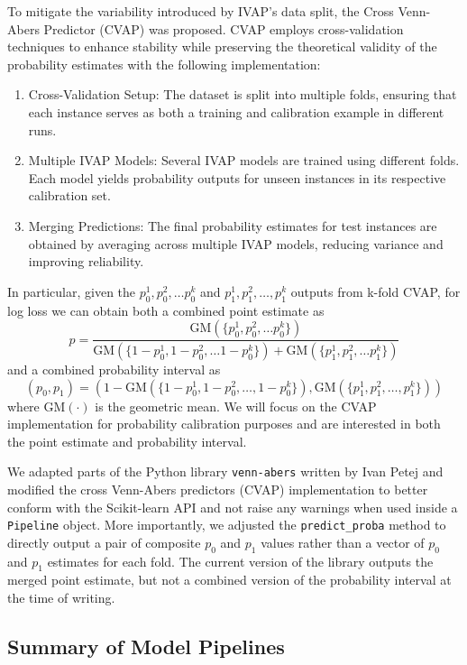 \documentclass[12pt,twoside]{report}
\begin{document}
To mitigate the variability introduced by IVAP’s data split, the Cross Venn-Abers Predictor (CVAP) was proposed. CVAP employs cross-validation techniques to enhance stability while preserving the theoretical validity of the probability estimates with the following implementation:
\begin{enumerate}
    \item Cross-Validation Setup: The dataset is split into multiple folds, ensuring that each instance serves as both a training and calibration example in different runs.

    \item Multiple IVAP Models: Several IVAP models are trained using different folds. Each model yields probability outputs for unseen instances in its respective calibration set.

    \item Merging Predictions: The final probability estimates for test instances are obtained by averaging across multiple IVAP models, reducing variance and improving reliability.
\end{enumerate}
In particular, given the $p_0^1, p_0^2, \ldots p_0^k$ and $p_1^1, p_1^2, \ldots, p_1^k$ outputs from k-fold CVAP, for log loss we can obtain both a combined point estimate as
$$p = \frac{\text{GM}(\{p_0^1, p_0^2, \ldots p_0^k\})}{\text{GM}(\{1-p_0^1, 1-p_0^2, \ldots 1-p_0^k\}) + \text{GM}(\{p_1^1, p_1^2, \ldots p_1^k\})}$$
and a combined probability interval as
$$(p_0, p_1) = \left(1 - \text{GM}(\{1 - p_0^1, 1 - p_0^2, \ldots, 1 - p_0^k \}), \text{GM}(\{p_1^1, p_1^2, \ldots, p_1^k\})\right)$$
where $\text{GM}(\cdot)$ is the geometric mean. We will focus on the CVAP implementation for probability calibration purposes and are interested in both the point estimate and probability interval.

We adapted parts of the Python library \texttt{venn-abers} written by Ivan Petej \citep{petej_2024} and modified the cross Venn-Abers predictors (CVAP) implementation to better conform with the Scikit-learn API and not raise any warnings when used inside a \texttt{Pipeline} object. More importantly, we adjusted the \texttt{predict\_proba} method to directly output a pair of composite $p_0$ and $p_1$ values rather than a vector of $p_0$ and $p_1$ estimates for each fold. The current version of the library outputs the merged point estimate, but not a combined version of the probability interval at the time of writing.

\subsection{Summary of Model Pipelines}
\end{document}
